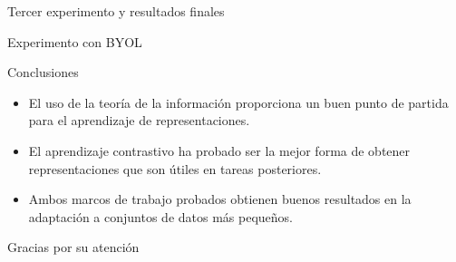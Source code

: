 \documentclass[aspectratio=169]{beamer}
\begin{document}
  
  
  \begin{frame}{Tercer experimento y resultados finales}

  \end{frame}

  
  
  \begin{frame}{Experimento con BYOL}

  
  
  
  \end{frame}
  

  


  
  \begin{frame}{Conclusiones}

    \begin{itemize}
      \item El uso de la teoría de la información proporciona un buen punto de partida para el aprendizaje de representaciones.
      \item El aprendizaje contrastivo ha probado ser la mejor forma de obtener representaciones que son útiles en tareas posteriores.
      \item Ambos marcos de trabajo probados obtienen buenos resultados en la adaptación a conjuntos de datos más pequeños.
    \end{itemize}
  \end{frame}
  
  \appendix

  \begin{frame}
    Gracias por su atención
  \end{frame}
\end{document}
